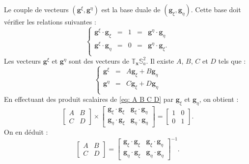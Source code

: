 Le couple de vecteurs $(\mathbf{g}^{\xi}, \mathbf{g}^{\eta})$ est la base duale de $(\mathbf{g}_{\xi}, \mathbf{g}_{\eta})$. Cette base doit vérifier les relations suivantes :
\begin{equation}
\left\lbrace
\begin{array}{rcccl}
\mathbf{g}^{\xi} \cdot \mathbf{g}_{\xi} & = & 1 & = & \mathbf{g}^{\eta} \cdot \mathbf{g}_{\eta} \\
\mathbf{g}^{\xi} \cdot \mathbf{g}_{\eta} & = & 0 & = & \mathbf{g}^{\eta} \cdot \mathbf{g}_{\xi}. \\
\end{array}
\right.
\label{eq: normalisation g_xi g_eta}
\end{equation}
Les vecteurs $\mathbf{g}^{\xi}$ et $\mathbf{g}^{\eta}$ sont des vecteurs de $\mathbb{T}_{\mathbf{x}}\mathbb{S}_a^2$. Il existe $A$, $B$, $C$ et $D$ tels que :
\begin{equation}
\left\lbrace
\begin{array}{rcl}
\mathbf{g}^{\xi} & = & A \mathbf{g}_{\xi} + B \mathbf{g}_{\eta} \\
\mathbf{g}^{\eta} & = & C \mathbf{g}_{\xi} + D \mathbf{g}_{\eta} \\
\end{array}
\right.
\label{eq: A B C D}
\end{equation}
En effectuant des produit scalaires de \eqref{eq: A B C D} par $\mathbf{g}_{\xi}$ et $\mathbf{g}_{\eta}$, on obtient :
\begin{equation}
\begin{bmatrix}
A & B \\ C &  D
\end{bmatrix}
\times
\begin{bmatrix}
\mathbf{g}_{\xi} \cdot \mathbf{g}_{\xi} & \mathbf{g}_{\xi} \cdot \mathbf{g}_{\eta} \\
\mathbf{g}_{\eta} \cdot \mathbf{g}_{\xi} & \mathbf{g}_{\eta} \cdot \mathbf{g}_{\eta}
\end{bmatrix}
= \begin{bmatrix}
1 & 0 \\ 0 &  1
\end{bmatrix}.
\end{equation}
On en déduit :
\begin{equation}
\begin{bmatrix}
A & B \\ C &  D
\end{bmatrix} 
=
\begin{bmatrix}
\mathbf{g}_{\xi} \cdot \mathbf{g}_{\xi} & \mathbf{g}_{\xi} \cdot \mathbf{g}_{\eta} \\
\mathbf{g}_{\eta} \cdot \mathbf{g}_{\xi} & \mathbf{g}_{\eta} \cdot \mathbf{g}_{\eta}
\end{bmatrix}^{-1}.
\end{equation}


